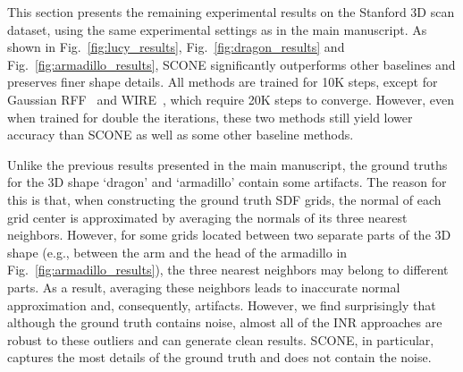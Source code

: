 \documentclass[letterpaper]{article} %
\begin{document}
This section presents the remaining experimental results on the Stanford 3D scan dataset, using the same experimental settings as in the main manuscript. As shown in Fig.~\ref{fig:lucy_results}, Fig.~\ref{fig:dragon_results} and Fig.~\ref{fig:armadillo_results}, SCONE significantly outperforms other baselines and preserves finer shape details. All methods are trained for 10K steps, except for Gaussian RFF~\cite{tancik2020fourier} and WIRE~\cite{saragadam2023wire}, which require 20K steps to converge. However, even when trained for double the iterations, these two methods still yield lower accuracy than SCONE as well as some other baseline methods.

Unlike the previous results presented in the main manuscript, the ground truths for the 3D shape `dragon'  and `armadillo' contain some artifacts. The reason for this is that, when constructing the ground truth SDF grids, the normal of each grid center is approximated by averaging the normals of its three nearest neighbors. However, for some grids located between two separate parts of the 3D shape (e.g., between the arm and the head of the armadillo in Fig.~\ref{fig:armadillo_results}), the three nearest neighbors may belong to different parts. As a result, averaging these neighbors leads to inaccurate normal approximation and, consequently, artifacts. However, we find surprisingly that although the ground truth contains noise, almost all of the INR approaches are robust to these outliers and can generate clean results. SCONE, in particular, captures the most details of the ground truth and does not contain the noise.
\end{document}

